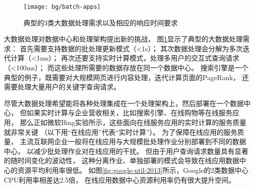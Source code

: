\begin{figure}[H]
  \centering
  \texttt{[image: bg/batch-apps]}
  \caption{典型的3类大数据处理需求以及相应的响应时间要求}
  \label{fig:batch-apps}
\end{figure}


大数据处理对数据中心和处理架构提出新的挑战，
图\ref{fig:batch-apps}显示了典型的大数据处理需求：
首先需要支持数据的批处理更新模式（<1s）；
其次数据处理会分解为多次迭代计算（<1ms）；
再次还要支持实时计算模式，处理多用户的交互式查询请求（<100ms）；
而这些处理所需要的数据存放在同一个数据中心。
搜索引擎是一个典型的例子，既需要对大规模网页进行内容处理，迭代计算页面的PageRank，
还需要处理大量用户的关键字查询请求。

尽管大数据处理希望能将各种处理集成在一个处理架构上，然后部署在一个数据中心，
但如果实时计算与企业营收相关，比如搜索引擎、在线购物等在线服务应用，
那么正如微软Bing实验所示，这些面向在线服务应用的实时计算的服务质量就非常关键
（以下用``在线应用''代表``实时计算''）。
为了保障在线应用的服务质量，
主流互联网企业一般将在线应用与大规模批处理作业分别部署到不同的数据中心，
以减少批处理作业对在线应用的干扰。
但由于用户查询请求数量具有显著的随时间变化的波动性，
这种分离作业、单独部署的模式会导致在线应用数据中心的资源平均利用率很低。
如图\ref{fig:google-util-2013}所示，Google的2类数据中心CPU利用率相差达2.5倍，
在线应用数据中心资源利用率仍有很大提升空间。




